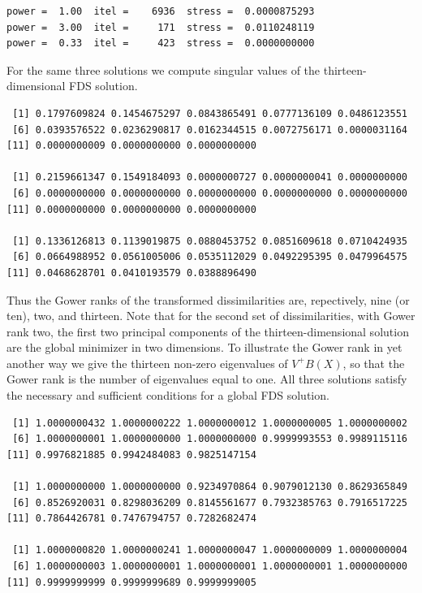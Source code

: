\documentclass[
  12pt,
  letterpaper,
  DIV=11,
  numbers=noendperiod]{scrreprt}
\theoremstyle{remark}
\begin{document}
\begin{verbatim}
power =  1.00  itel =    6936  stress =  0.0000875293 
power =  3.00  itel =     171  stress =  0.0110248119 
power =  0.33  itel =     423  stress =  0.0000000000 
\end{verbatim}

For the same three solutions we compute singular values of the
thirteen-dimensional FDS solution.

\begin{verbatim}
 [1] 0.1797609824 0.1454675297 0.0843865491 0.0777136109 0.0486123551
 [6] 0.0393576522 0.0236290817 0.0162344515 0.0072756171 0.0000031164
[11] 0.0000000009 0.0000000000 0.0000000000

 [1] 0.2159661347 0.1549184093 0.0000000727 0.0000000041 0.0000000000
 [6] 0.0000000000 0.0000000000 0.0000000000 0.0000000000 0.0000000000
[11] 0.0000000000 0.0000000000 0.0000000000

 [1] 0.1336126813 0.1139019875 0.0880453752 0.0851609618 0.0710424935
 [6] 0.0664988952 0.0561005006 0.0535112029 0.0492295395 0.0479964575
[11] 0.0468628701 0.0410193579 0.0388896490
\end{verbatim}

Thus the Gower ranks of the transformed dissimilarities are,
repectively, nine (or ten), two, and thirteen. Note that for the second
set of dissimilarities, with Gower rank two, the first two principal
components of the thirteen-dimensional solution are the global minimizer
in two dimensions. To illustrate the Gower rank in yet another way we
give the thirteen non-zero eigenvalues of \(V^+B(X)\), so that the Gower
rank is the number of eigenvalues equal to one. All three solutions
satisfy the necessary and sufficient conditions for a global FDS
solution.

\begin{verbatim}
 [1] 1.0000000432 1.0000000222 1.0000000012 1.0000000005 1.0000000002
 [6] 1.0000000001 1.0000000000 1.0000000000 0.9999993553 0.9989115116
[11] 0.9976821885 0.9942484083 0.9825147154

 [1] 1.0000000000 1.0000000000 0.9234970864 0.9079012130 0.8629365849
 [6] 0.8526920031 0.8298036209 0.8145561677 0.7932385763 0.7916517225
[11] 0.7864426781 0.7476794757 0.7282682474

 [1] 1.0000000820 1.0000000241 1.0000000047 1.0000000009 1.0000000004
 [6] 1.0000000003 1.0000000001 1.0000000001 1.0000000001 1.0000000000
[11] 0.9999999999 0.9999999689 0.9999999005
\end{verbatim}
\end{document}
